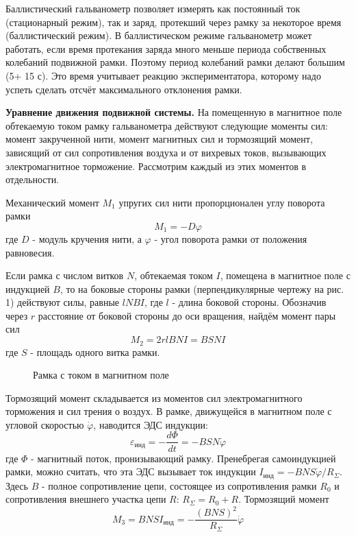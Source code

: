 \documentclass[14pt]{article}
\begin{document}
Баллистический гальванометр позволяет измерять как постоянный ток (стационарный режим), так и заряд, протекший через рамку за некоторое время (баллистический режим). В баллистическом режиме гальванометр может работать, если время протекания заряда много меньше периода собственных колебаний подвижной рамки. Поэтому период колебаний рамки делают большим (5+ 15 с). Это время учитывает реакцию экспериментатора, которому надо успеть сделать отсчёт максимального отклонения рамки.

\textbf{Уравнение движения подвижной системы.} На помещенную в магнитное поле обтекаемую током рамку гальванометра действуют следующие моменты сил: момент закрученной нити, момент магнитных сил и тормозящий момент, зависящий от сил сопротивления воздуха и от вихревых токов, вызывающих электромагнитное торможение. Рассмотрим каждый из этих моментов в отдельности.

Механический момент $M_1$ упругих сил нити пропорционален углу поворота рамки
\begin{equation}
	M_1 = -D\varphi
\end{equation}
где $D$ - модуль кручения нити, а $\varphi$ - угол поворота рамки от положения равновесия.

Если рамка с числом витков $N$, обтекаемая током $I$, помещена в магнитное поле с индукцией $B$, то на боковые стороны рамки (перпендикулярные чертежу на рис. 1) действуют силы, равные $lNBI$, где $l$ - длина боковой стороны. Обозначив через $r$ расстояние от боковой стороны до оси вращения, найдём момент пары сил 
\begin{equation}
	M_2 = 2rlBNI = BSNI
\end{equation}
где $S$ - площадь одного витка рамки.

\begin{figure}[h!]
	\caption{Рамка с током в магнитном поле}
	\label{fig:image}
\end{figure}

Тормозящий момент складывается из моментов сил электромагнитного торможения и сил трения о воздух. В рамке, движущейся в магнитном поле с угловой скоростью $\dot{\varphi}$, наводится ЭДС индукции:
$$
	\varepsilon_{\text{инд}} = -\frac{d\Phi}{dt} = -BSN\dot{\varphi}
$$
где $\Phi$ - магнитный поток, пронизывающий рамку. Пренебрегая самоиндукцией рамки, можно считать, что эта ЭДС вызывает ток индукции 
$I_{\text{инд}} = -BNS\dot{\varphi}/R_{\Sigma}$. Здесь $B$ - полное сопротивление цепи, состоящее из сопротивления рамки $R_0$ и сопротивления внешнего участка цепи $R$:
$R_\Sigma = R_0 + R$. Тормозящий момент
\begin{equation}
	M_3 = BNSI_{\text{инд}} = -\frac{(BNS)^2}{R_\Sigma}\dot{\varphi}
\end{equation}
\end{document}
